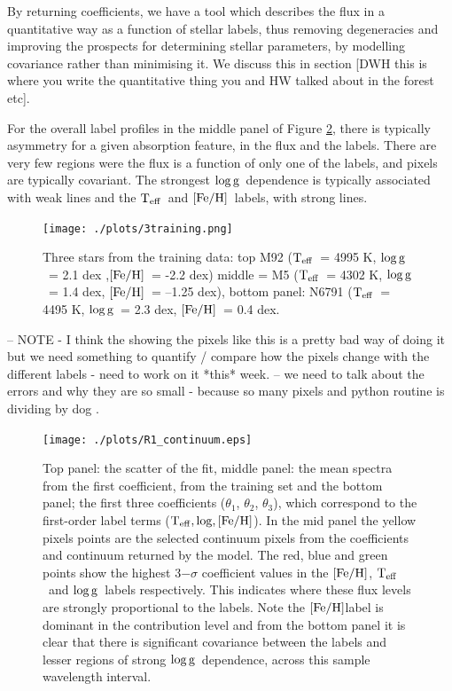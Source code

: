 \documentclass[12pt, preprint]{aastex}
\newcommand{\teff}{\mbox{$\rm T_{eff}$}}
\newcommand{\feh}{\mbox{$\rm [Fe/H]$}}
\newcommand{\logg}{\mbox{$\rm \log g$}}
\begin{document}
By returning coefficients, we have a tool which describes the flux in a quantitative way as a function of stellar labels, thus removing degeneracies and improving the prospects for determining stellar parameters, by modelling covariance rather than minimising it. We discuss this in section [DWH this is where you write the quantitative thing you and HW talked about in the forest etc].

For the overall label profiles in the middle panel of Figure \ref{fig:coeffs}, there is typically asymmetry for a given absorption feature, in the flux and the labels. There are very few regions were the flux is a function of only one of the labels, and pixels are typically covariant. The strongest \logg\ dependence is typically associated with weak lines and the \teff\ and \feh\ labels, with strong lines. 



\begin{figure}[h!]
  \texttt{[image: ./plots/3training.png]}
\caption{Three stars from the training data: top M92 (\teff\ = 4995 K, \logg\ = 2.1 dex ,\feh\, = -2.2 dex) middle = M5 (\teff\ = 4302 K, \logg\ = 1.4 dex, \feh\ = --1.25 dex), bottom panel: N6791 (\teff\  = 4495 K, \logg\ = 2.3 dex, \feh\ = 0.4 dex. }
\label{fig:cal_feh}
\end{figure}


-- NOTE - I think the showing the pixels like this is a pretty bad way of doing it but we need something to quantify / compare how the pixels change with the different labels - need to work on it *this* week. 
 -- we need to talk about the errors and why they are so small - because so many pixels and python routine is dividing by dog .
 
 
\begin{figure}[h!]
  \texttt{[image: ./plots/R1\_continuum.eps]}
\caption{Top panel: the scatter of the fit, middle panel: the mean spectra from the first coefficient, from the training set and the bottom panel; the first three coefficients ($\theta_1$, $\theta_2$, $\theta_3$),  which correspond to the first-order label terms ($\teff, \log, \feh$). In the mid panel the yellow pixels points are the selected continuum pixels from the coefficients and continuum returned by the model.  The red, blue and green points show the highest 3$-\sigma$ coefficient values in the \feh, \teff\ and \logg\ labels respectively. This indicates where these flux levels are strongly proportional to the labels. Note the \feh label is dominant in the contribution level and from the bottom panel it is clear that there is significant covariance between the labels and lesser regions of strong \logg\ dependence, across this sample wavelength interval.}
\label{fig:coeffs}
\end{figure}
\end{document}

